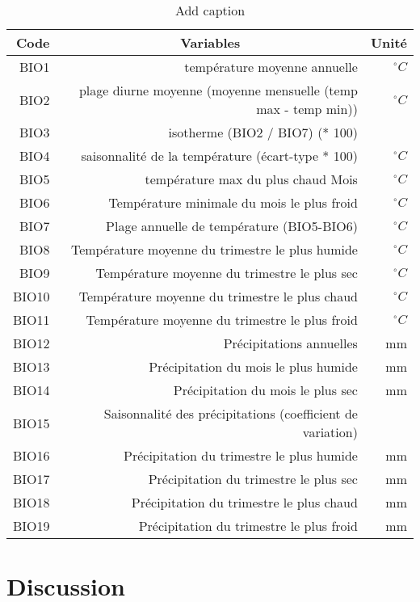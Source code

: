 \documentclass[a4paper, oneside, 12pt]{book}
\begin{document}
\begin{table}[htbp]
	\centering
	\caption{Add caption}
	\begin{tabular}{|r|r|r|}
		\toprule
		\textbf{Code} & \multicolumn{1}{c}{\textbf{Variables }} & Unité \\
		\midrule
		BIO1  & température moyenne annuelle & $^{\circ}C$ \\
		BIO2  & plage diurne moyenne (moyenne mensuelle (temp max - temp min)) & $^{\circ}C$ \\
		BIO3  &  isotherme (BIO2 / BIO7) (* 100) &  \\
		BIO4  & saisonnalité de la température (écart-type * 100) & $^{\circ}C$ \\
		BIO5  & température max du plus chaud Mois & $^{\circ}C$ \\
		BIO6  & Température minimale du mois le plus froid & $^{\circ}C$ \\
		BIO7  & Plage annuelle de température (BIO5-BIO6) & $^{\circ}C$ \\
		BIO8  & Température moyenne du trimestre le plus humide & $^{\circ}C$ \\
		BIO9  & Température moyenne du trimestre le plus sec & $^{\circ}C$ \\
		BIO10 & Température moyenne du trimestre le plus chaud & $^{\circ}C$ \\
		BIO11 & Température moyenne du trimestre le plus froid & $^{\circ}C$ \\
		BIO12 & Précipitations annuelles & mm \\
		BIO13 & Précipitation du mois le plus humide  & mm \\
		BIO14 & Précipitation du mois le plus sec & mm \\
		BIO15 & Saisonnalité des précipitations (coefficient de variation) &  \\
		BIO16 & Précipitation du trimestre le plus humide & mm \\
		BIO17 & Précipitation du trimestre le plus sec & mm \\
		BIO18 & Précipitation du trimestre le plus chaud & mm \\
		BIO19 & Précipitation du trimestre le plus froid & mm \\
		\bottomrule
	\end{tabular}%
	\label{tab:addlabel}%
\end{table}%
\part{Discussion}
\end{document}
